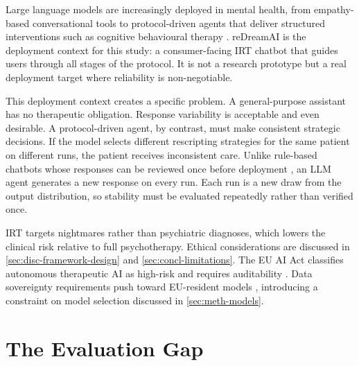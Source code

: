 Large language models are increasingly deployed in mental health, from empathy-based conversational tools to protocol-driven agents that deliver structured interventions such as cognitive behavioural therapy \autocite{DTKNEPHQ,R3Y7UHDE}.
reDreamAI is the deployment context for this study: a consumer-facing IRT chatbot that guides users through all stages of the protocol.
It is not a research prototype but a real deployment target where reliability is non-negotiable.

This deployment context creates a specific problem.
A general-purpose assistant has no therapeutic obligation. Response variability is acceptable and even desirable.
A protocol-driven agent, by contrast, must make consistent strategic decisions.
If the model selects different rescripting strategies for the same patient on different runs, the patient receives inconsistent care.
Unlike rule-based chatbots whose responses can be reviewed once before deployment \autocite{YE8KQTNH}, an LLM agent generates a new response on every run.
Each run is a new draw from the output distribution, so stability must be evaluated repeatedly rather than verified once.

IRT targets nightmares rather than psychiatric diagnoses, which lowers the clinical risk relative to full psychotherapy.
Ethical considerations are discussed in \autoref{sec:disc-framework-design} and \autoref{sec:concl-limitations}.
The EU AI Act classifies autonomous therapeutic AI as high-risk and requires auditability \autocite{X5TYM56Q,A823HQRV}.
Data sovereignty requirements push toward EU-resident models \autocite{2QMKF3RM}, introducing a constraint on model selection discussed in \autoref{sec:meth-models}.

\section{The Evaluation Gap}
\label{sec:intro-eval-gap}

